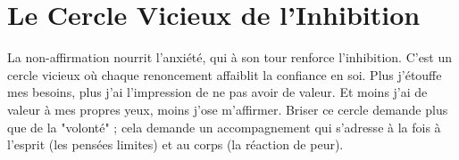 \section{Le Cercle Vicieux de l'Inhibition}
La non-affirmation nourrit l'anxiété, qui à son tour renforce l'inhibition. C'est un cercle vicieux où chaque renoncement affaiblit la confiance en soi. Plus j'étouffe mes besoins, plus j'ai l'impression de ne pas avoir de valeur. Et moins j'ai de valeur à mes propres yeux, moins j'ose m'affirmer. Briser ce cercle demande plus que de la "volonté" ; cela demande un accompagnement qui s'adresse à la fois à l'esprit (les pensées limites) et au corps (la réaction de peur).
